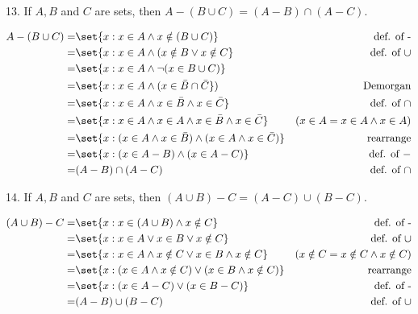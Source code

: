 \documentclass{hippoidC}
\begin{document}
\begin{prooflist}{13. If $A, B$ and $C$ are sets, then $A-(B \cup C)=(A-B) \cap(A-C)$.}
	\item
	\begin{align*}
		A-(B \cup C)= & \set{x: x\in A \land x\notin(B \cup C)}                               & \text{def. of -}                \\
		=             & \set{x: x\in A \land (x\notin B \lor x\notin C}                       & \text{def. of $\cup$}           \\
		=             & \set{x: x\in A \land \neg{(x\in B \cup C})}                           &                                 \\
		=             & \set{x: x\in A \land (x\in \bar{B} \cap \bar{C}})                     & \text{Demorgan}                 \\
		=             & \set{x: x\in A \land x\in \bar{B} \land x\in\bar{C}}                  & \text{def. of }\cap             \\
		=             & \set{x: x\in A \land x\in A \land x\in \bar{B} \land x\in\bar{C}}     & (x\in A = x\in A \land x \in A) \\
		=             & \set{x: (x\in A \land x\in \bar{B}) \land (x\in A \land x\in\bar{C})} & \text{rearrange}                \\
		=             & \set{x: (x\in A  - B) \land (x\in A - C)}                             & \text{def. of }-                \\
		=             & (A - B) \cap (A-C)                                                    & \text{def. of }\cap
	\end{align*}
\end{prooflist}

\begin{prooflist}{14. If $A, B$ and $C$ are sets, then $(A \cup B)-C=(A-C) \cup(B-C)$.}
	\item
	\begin{align*}
		(A\cup B) - C = & \set{x: x\in (A\cup B) \land x\notin C}                         & \text{def. of -}                         \\
		=               & \set{x: x\in A \lor x \in B \lor x\notin C}                     & \text{def. of $\cup$}                    \\
		=               & \set{x: x\in A \land x\notin C \lor x\in B \land x\notin C}     & (x\notin C = x\notin C \land x \notin C) \\
		=               & \set{x: (x\in A \land x\notin C) \lor (x\in B \land x\notin C)} & \text{rearrange}                         \\
		=               & \set{x: (x\in A  - C) \lor (x\in B - C)}                        & \text{def. of -}                         \\
		=               & (A - B) \cup (B-C)                                              & \text{def. of }\cup
	\end{align*}
\end{prooflist}
\end{document}
